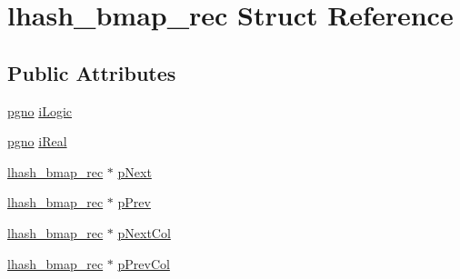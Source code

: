 \hypertarget{structlhash__bmap__rec}{\section{lhash\-\_\-bmap\-\_\-rec Struct Reference}
\label{d8/d06/structlhash__bmap__rec}
}
\subsection*{Public Attributes}
\begin{DoxyCompactItemize}
\item 
\hyperlink{unqlite_8c_a90bf132c9229151f7c29e84e592907cd}{pgno} \hyperlink{structlhash__bmap__rec_a5fb2f791136bb5735981d6cc793ad759}{i\-Logic}
\item 
\hyperlink{unqlite_8c_a90bf132c9229151f7c29e84e592907cd}{pgno} \hyperlink{structlhash__bmap__rec_af02b75be281e4dffd79443963f797456}{i\-Real}
\item 
\hyperlink{structlhash__bmap__rec}{lhash\-\_\-bmap\-\_\-rec} $\ast$ \hyperlink{structlhash__bmap__rec_a5e655ec32dbb72d8b7c5a4e6f8d58ba5}{p\-Next}
\item 
\hyperlink{structlhash__bmap__rec}{lhash\-\_\-bmap\-\_\-rec} $\ast$ \hyperlink{structlhash__bmap__rec_aed00d1647f46e737c946e74a1610ada3}{p\-Prev}
\item 
\hyperlink{structlhash__bmap__rec}{lhash\-\_\-bmap\-\_\-rec} $\ast$ \hyperlink{structlhash__bmap__rec_a8963f2a1b5cb043bca806466baeba4ad}{p\-Next\-Col}
\item 
\hyperlink{structlhash__bmap__rec}{lhash\-\_\-bmap\-\_\-rec} $\ast$ \hyperlink{structlhash__bmap__rec_a886184e27e3e0e7621dec8b86ff6ee24}{p\-Prev\-Col}
\end{DoxyCompactItemize}


